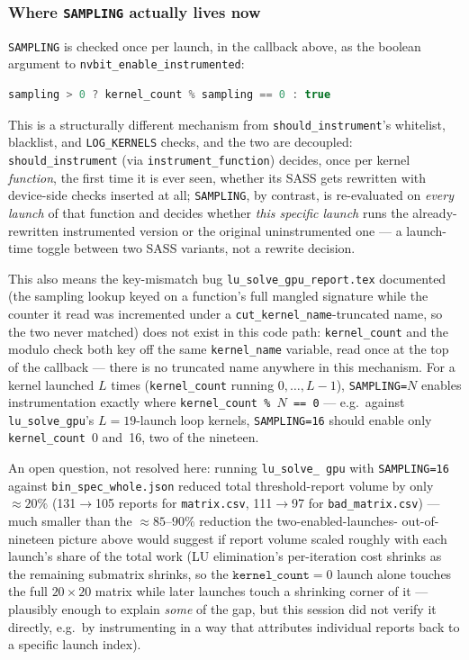\documentclass[11pt]{article}
\begin{document}
\subsubsection*{Where \texttt{SAMPLING} actually lives now}
\label{sec:sampling-launch-gate}

\texttt{SAMPLING} is checked once per launch, in the callback above, as
the boolean argument to
\texttt{nvbit\_\allowbreak enable\_\allowbreak instrumented}:
\begin{lstlisting}[language=C++]
sampling > 0 ? kernel_count % sampling == 0 : true
\end{lstlisting}
This is a structurally different mechanism from
\texttt{should\_\allowbreak instrument}'s whitelist, blacklist, and
\texttt{LOG\_KERNELS} checks, and the two are decoupled:
\texttt{should\_\allowbreak instrument} (via
\texttt{instrument\_\allowbreak function}) decides, once per kernel
\emph{function}, the first time it is ever seen, whether its SASS gets
rewritten with device-side checks inserted at all; \texttt{SAMPLING}, by
contrast, is re-evaluated on \emph{every launch} of that function and
decides whether \emph{this specific launch} runs the already-rewritten
instrumented version or the original uninstrumented one --- a launch-time
toggle between two SASS variants, not a rewrite decision.

This also means the key-mismatch bug \texttt{lu\_solve\_gpu\_report.tex}
documented (the sampling lookup keyed on a function's full mangled
signature while the counter it read was incremented under a
\texttt{cut\_kernel\_name}-truncated name, so the two never matched) does
not exist in this code path: \texttt{kernel\_count} and the modulo check
both key off the same \texttt{kernel\_name} variable, read once at the top
of the callback --- there is no truncated name anywhere in this
mechanism. For a kernel launched $L$ times (\texttt{kernel\_count} running
$0,\dots,L{-}1$), \texttt{SAMPLING=}$N$ enables instrumentation exactly
where \texttt{kernel\_count \% }$N$\texttt{ == 0} --- e.g.\ against
\texttt{lu\_solve\_gpu}'s $L{=}19$-launch loop kernels, \texttt{SAMPLING=16}
should enable only \texttt{kernel\_count}~0 and~16, two of the nineteen.

An open question, not resolved here: running \texttt{lu\_solve\_\allowbreak
gpu} with \texttt{SAMPLING=16} against
\texttt{bin\_spec\_\allowbreak whole.json} reduced total
threshold-report volume by only $\approx\!20\%$ (131$\to$105 reports for
\texttt{matrix.csv}, 111$\to$97 for \texttt{bad\_matrix.csv}) --- much
smaller than the $\approx\!85$--$90\%$ reduction the two-enabled-launches-
out-of-nineteen picture above would suggest if report volume scaled
roughly with each launch's share of the total work (LU elimination's
per-iteration cost shrinks as the remaining submatrix shrinks, so the
$\mathtt{kernel\_count}{=}0$ launch alone touches the full
$20\times20$ matrix while later launches touch a shrinking corner of it
--- plausibly enough to explain \emph{some} of the gap, but this session
did not verify it directly, e.g.\ by instrumenting in a way that
attributes individual reports back to a specific launch index).
\end{document}
